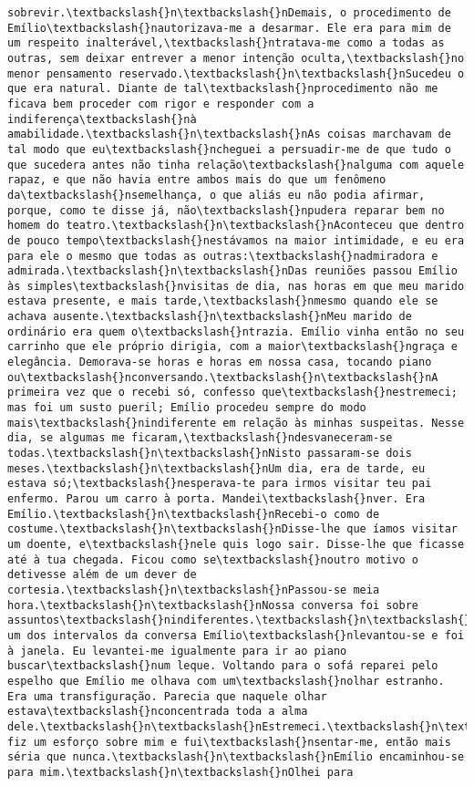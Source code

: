 \documentclass[11pt]{article}
\begin{document}
\begin{Verbatim}[commandchars=\\\{\}]
sobrevir.\textbackslash{}n\textbackslash{}nDemais, o procedimento de Emílio\textbackslash{}nautorizava-me a desarmar. Ele era para mim de um respeito inalterável,\textbackslash{}ntratava-me como a todas as outras, sem deixar entrever a menor intenção oculta,\textbackslash{}no menor pensamento reservado.\textbackslash{}n\textbackslash{}nSucedeu o que era natural. Diante de tal\textbackslash{}nprocedimento não me ficava bem proceder com rigor e responder com a indiferença\textbackslash{}nà amabilidade.\textbackslash{}n\textbackslash{}nAs coisas marchavam de tal modo que eu\textbackslash{}ncheguei a persuadir-me de que tudo o que sucedera antes não tinha relação\textbackslash{}nalguma com aquele rapaz, e que não havia entre ambos mais do que um fenômeno da\textbackslash{}nsemelhança, o que aliás eu não podia afirmar, porque, como te disse já, não\textbackslash{}npudera reparar bem no homem do teatro.\textbackslash{}n\textbackslash{}nAconteceu que dentro de pouco tempo\textbackslash{}nestávamos na maior intimidade, e eu era para ele o mesmo que todas as outras:\textbackslash{}nadmiradora e admirada.\textbackslash{}n\textbackslash{}nDas reuniões passou Emílio às simples\textbackslash{}nvisitas de dia, nas horas em que meu marido estava presente, e mais tarde,\textbackslash{}nmesmo quando ele se achava ausente.\textbackslash{}n\textbackslash{}nMeu marido de ordinário era quem o\textbackslash{}ntrazia. Emílio vinha então no seu carrinho que ele próprio dirigia, com a maior\textbackslash{}ngraça e elegância. Demorava-se horas e horas em nossa casa, tocando piano ou\textbackslash{}nconversando.\textbackslash{}n\textbackslash{}nA primeira vez que o recebi só, confesso que\textbackslash{}nestremeci; mas foi um susto pueril; Emílio procedeu sempre do modo mais\textbackslash{}nindiferente em relação às minhas suspeitas. Nesse dia, se algumas me ficaram,\textbackslash{}ndesvaneceram-se todas.\textbackslash{}n\textbackslash{}nNisto passaram-se dois meses.\textbackslash{}n\textbackslash{}nUm dia, era de tarde, eu estava só;\textbackslash{}nesperava-te para irmos visitar teu pai enfermo. Parou um carro à porta. Mandei\textbackslash{}nver. Era Emílio.\textbackslash{}n\textbackslash{}nRecebi-o como de costume.\textbackslash{}n\textbackslash{}nDisse-lhe que íamos visitar um doente, e\textbackslash{}nele quis logo sair. Disse-lhe que ficasse até à tua chegada. Ficou como se\textbackslash{}noutro motivo o detivesse além de um dever de cortesia.\textbackslash{}n\textbackslash{}nPassou-se meia hora.\textbackslash{}n\textbackslash{}nNossa conversa foi sobre assuntos\textbackslash{}nindiferentes.\textbackslash{}n\textbackslash{}nEm um dos intervalos da conversa Emílio\textbackslash{}nlevantou-se e foi à janela. Eu levantei-me igualmente para ir ao piano buscar\textbackslash{}num leque. Voltando para o sofá reparei pelo espelho que Emílio me olhava com um\textbackslash{}nolhar estranho. Era uma transfiguração. Parecia que naquele olhar estava\textbackslash{}nconcentrada toda a alma dele.\textbackslash{}n\textbackslash{}nEstremeci.\textbackslash{}n\textbackslash{}nTodavia fiz um esforço sobre mim e fui\textbackslash{}nsentar-me, então mais séria que nunca.\textbackslash{}n\textbackslash{}nEmílio encaminhou-se para mim.\textbackslash{}n\textbackslash{}nOlhei para 
\end{Verbatim}
\end{document}
